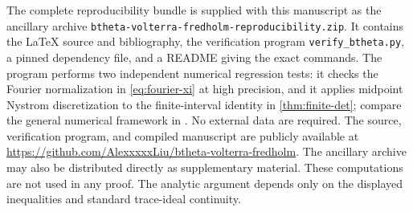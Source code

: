 \documentclass[11pt,reqno]{amsart}
\numberwithin{equation}{section}
\newcommand{\1}{\mathbf 1}
\begin{document}
The complete reproducibility bundle is supplied with this manuscript as the
ancillary archive
\texttt{btheta-volterra-fredholm-reproducibility.zip}.  It contains the
\LaTeX{} source and bibliography, the verification program
\texttt{verify\_btheta.py}, a pinned dependency file, and a README giving the
exact commands.  The program performs two independent numerical regression
tests: it checks the Fourier normalization in \cref{eq:fourier-xi} at high
precision, and it applies midpoint Nystrom discretization to the
finite-interval identity in \cref{thm:finite-det}; compare the general
numerical framework in \cite{Bornemann2010}.  No external data are required.
The source, verification program, and compiled manuscript are publicly
available at
\url{https://github.com/AlexxxxxLiu/btheta-volterra-fredholm}.
The ancillary archive may also be distributed directly as supplementary
material.  These computations are not used in any proof.  The analytic
argument depends only on the displayed inequalities and standard trace-ideal
continuity.

\enlargethispage{4\baselineskip}


\end{document}
